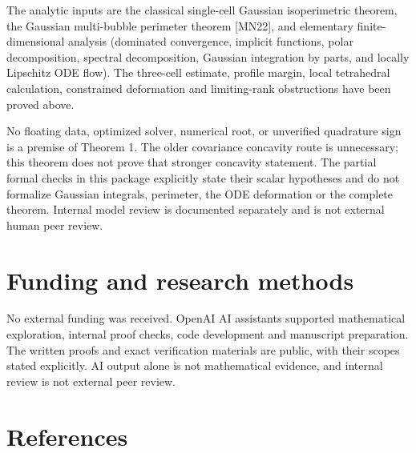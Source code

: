 \documentclass[
  11pt,
]{article}
\begin{document}
The analytic inputs are the classical single-cell Gaussian isoperimetric
theorem, the Gaussian multi-bubble perimeter theorem {[}MN22{]}, and
elementary finite-dimensional analysis (dominated convergence, implicit
functions, polar decomposition, spectral decomposition, Gaussian
integration by parts, and locally Lipschitz ODE flow). The three-cell
estimate, profile margin, local tetrahedral calculation, constrained
deformation and limiting-rank obstructions have been proved above.

No floating data, optimized solver, numerical root, or unverified
quadrature sign is a premise of Theorem 1. The older covariance
concavity route is unnecessary; this theorem does not prove that
stronger concavity statement. The partial formal checks in this package
explicitly state their scalar hypotheses and do not formalize Gaussian
integrals, perimeter, the ODE deformation or the complete theorem.
Internal model review is documented separately and is not external human
peer review.


\section*{Funding and research methods}
No external funding was received. OpenAI AI assistants supported
mathematical exploration, internal proof checks, code development and
manuscript preparation. The written proofs and exact verification
materials are public, with their scopes stated explicitly. AI output
alone is not mathematical evidence, and internal review is not external
peer review.
\small\section{References}\label{references}
\end{document}
